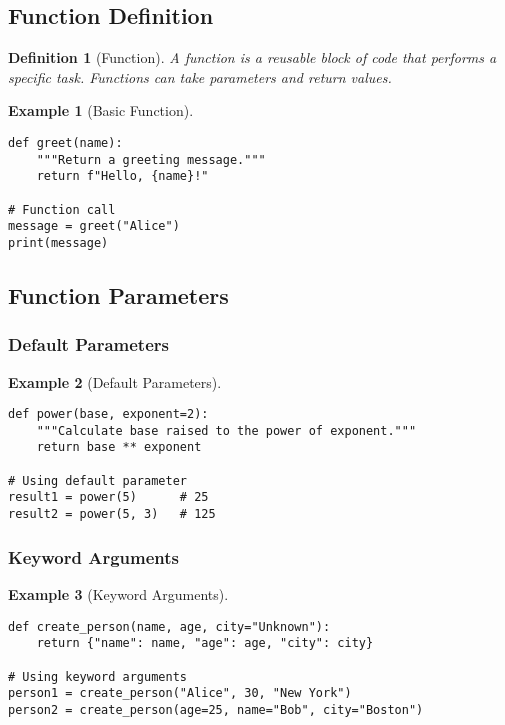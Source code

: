 \documentclass[11pt]{article}
\newtheorem{definition}{Definition}[section]
\newtheorem{example}{Example}[section]
\begin{document}
\subsection{Function Definition}

\begin{definition}[Function]
A function is a reusable block of code that performs a specific task. Functions can take parameters and return values.
\end{definition}

\begin{example}[Basic Function]
\begin{lstlisting}
def greet(name):
    """Return a greeting message."""
    return f"Hello, {name}!"

# Function call
message = greet("Alice")
print(message)
\end{lstlisting}
\end{example}

\subsection{Function Parameters}

\subsubsection{Default Parameters}

\begin{example}[Default Parameters]
\begin{lstlisting}
def power(base, exponent=2):
    """Calculate base raised to the power of exponent."""
    return base ** exponent

# Using default parameter
result1 = power(5)      # 25
result2 = power(5, 3)   # 125
\end{lstlisting}
\end{example}

\subsubsection{Keyword Arguments}

\begin{example}[Keyword Arguments]
\begin{lstlisting}
def create_person(name, age, city="Unknown"):
    return {"name": name, "age": age, "city": city}

# Using keyword arguments
person1 = create_person("Alice", 30, "New York")
person2 = create_person(age=25, name="Bob", city="Boston")
\end{lstlisting}
\end{example}
\end{document}
